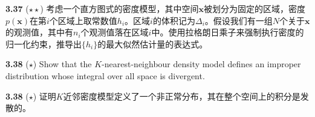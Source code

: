 \documentclass{article}
\begin{document}
\textbf{3.37} ($\star\star$) 考虑一个直方图式的密度模型，其中空间$\mathbf{x}$被划分为固定的区域，密度$p(\mathbf{x})$在第$i$个区域上取常数值$h_i$。区域$i$的体积记为$\Delta_i$。假设我们有一组$N$个关于$\mathbf{x}$的观测值，其中有$n_i$个观测值落在区域$i$中。使用拉格朗日乘子来强制执行密度的归一化约束，推导出$\{h_i\}$的最大似然估计量的表达式。

\textbf{3.38} ($\star$) Show that the $K$-nearest-neighbour density model defines an improper distribution whose integral over all space is divergent.

\textbf{3.38} ($\star$) 证明$K$近邻密度模型定义了一个非正常分布，其在整个空间上的积分是发散的。
\end{document}
